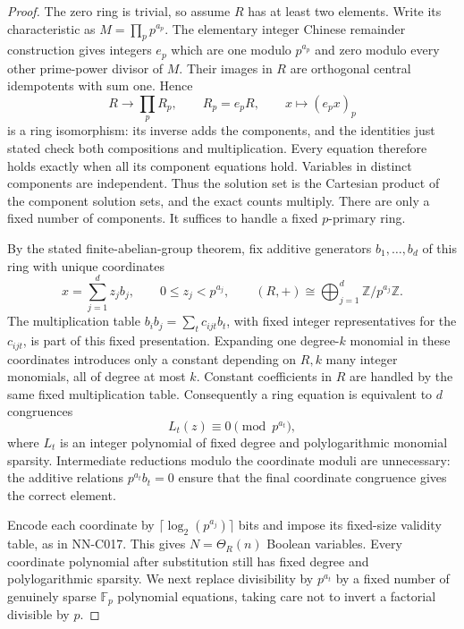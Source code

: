 \begin{proof}
The zero ring is trivial, so assume $R$ has at least two elements. Write its characteristic as $M=\prod_p p^{a_p}$. The elementary integer Chinese remainder construction gives integers $e_p$ which are one modulo $p^{a_p}$ and zero modulo every other prime-power divisor of $M$. Their images in $R$ are orthogonal central idempotents with sum one. Hence
\[
 R\longrightarrow\prod_p R_p,\qquad R_p=e_pR,\qquad
 x\longmapsto(e_px)_p
\]
is a ring isomorphism: its inverse adds the components, and the identities just stated check both compositions and multiplication. Every equation therefore holds exactly when all its component equations hold. Variables in distinct components are independent. Thus the solution set is the Cartesian product of the component solution sets, and the exact counts multiply. There are only a fixed number of components. It suffices to handle a fixed $p$-primary ring.

By the stated finite-abelian-group theorem, fix additive generators $b_1,\ldots,b_d$ of this ring with unique coordinates
\[
 x=\sum_{j=1}^d z_jb_j,
 \qquad0\leq z_j<p^{a_j},\qquad
 (R,+)\cong\bigoplus_{j=1}^d\mathbb Z/p^{a_j}\mathbb Z.
\]
The multiplication table $b_ib_j=\sum_t c_{ijt}b_t$, with fixed integer representatives for the $c_{ijt}$, is part of this fixed presentation. Expanding one degree-$k$ monomial in these coordinates introduces only a constant depending on $R,k$ many integer monomials, all of degree at most $k$. Constant coefficients in $R$ are handled by the same fixed multiplication table. Consequently a ring equation is equivalent to $d$ congruences
\[
 L_t(z)\equiv0\pmod{p^{a_t}},
\]
where $L_t$ is an integer polynomial of fixed degree and polylogarithmic monomial sparsity. Intermediate reductions modulo the coordinate moduli are unnecessary: the additive relations $p^{a_t}b_t=0$ ensure that the final coordinate congruence gives the correct element.

Encode each coordinate by $\lceil\log_2(p^{a_j})\rceil$ bits and impose its fixed-size validity table, as in NN-C017. This gives $N=\Theta_R(n)$ Boolean variables. Every coordinate polynomial after substitution still has fixed degree and polylogarithmic sparsity. We next replace divisibility by $p^{a_t}$ by a fixed number of genuinely sparse $\mathbb F_p$ polynomial equations, taking care not to invert a factorial divisible by $p$.


\end{proof}
